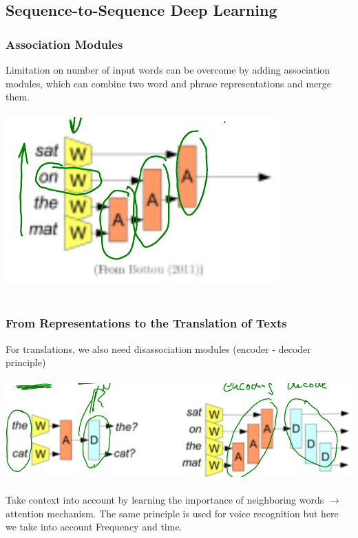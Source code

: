 \documentclass{article}
\begin{document}
\subsection{Sequence-to-Sequence Deep Learning}
\subsubsection{Association Modules}
Limitation on number of input words can be overcome by adding association modules, which can combine two word and phrase representations and merge them.\\\\
\includegraphics[scale=0.3]{98.png}\\\\
\subsubsection{From Representations to the Translation of Texts}
For translations, we also need disassociation modules (encoder - decoder principle)\\\\
\includegraphics[scale=0.3]{99.png}\\\\
Take context into account by learning the importance of neighboring words $\rightarrow$ attention mechanism. The same principle is used for voice recognition but here we take into account Frequency and time.
\end{document}
